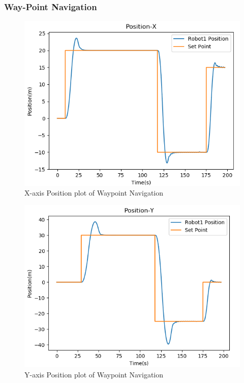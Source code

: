 \documentclass[10pt]{beamer}
\begin{document}
\begin{frame}
	\frametitle{Way-Point Navigation}
	\begin{minipage}{0.47\textwidth}
		\begin{figure}[h!]
			\centering
			\includegraphics[scale=0.27]{Position-X-single.png}
			\caption{X-axis Position plot of Waypoint Navigation}
			\label{Fig:pos_x}
		\end{figure}
	\end{minipage}
	\begin{minipage}{0.47\textwidth}
		\begin{figure}[h!]
			\centering
			\includegraphics[scale=0.27]{Position-Y-single.png}
			\caption{Y-axis Position plot of Waypoint Navigation}
			\label{Fig:pos_y}
		\end{figure}
	\end{minipage}
\end{frame}
\end{document}

